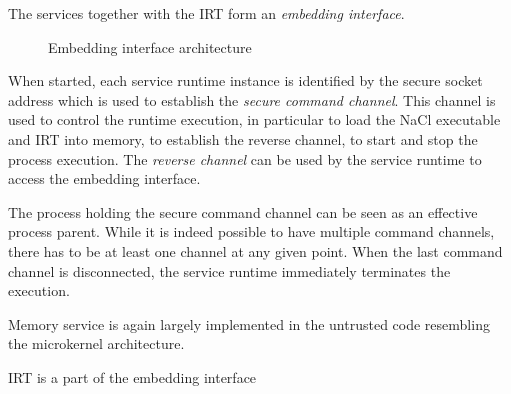 The services together with the IRT form an \emph{embedding interface}.



\begin{figure}
\centering
\caption{Embedding interface architecture}
\label{fig:architecture}
\end{figure}

When started, each service runtime instance is identified by the
secure socket address which is used to establish the \emph{secure
command channel}. This channel is used to control the runtime execution,
in particular to load the NaCl executable and IRT into memory, to
establish the reverse channel, to start and stop the process execution.
The \emph{reverse channel} can be used by the service runtime to access
the embedding interface.

The process holding the secure command channel can be seen as an
effective process parent. While it is indeed possible to have multiple
command channels, there has to be at least one channel at any given
point.  When the last command channel is disconnected, the service
runtime immediately terminates the execution.


Memory service is again largely implemented in the untrusted code
resembling the microkernel architecture.

IRT is a part of the embedding interface


